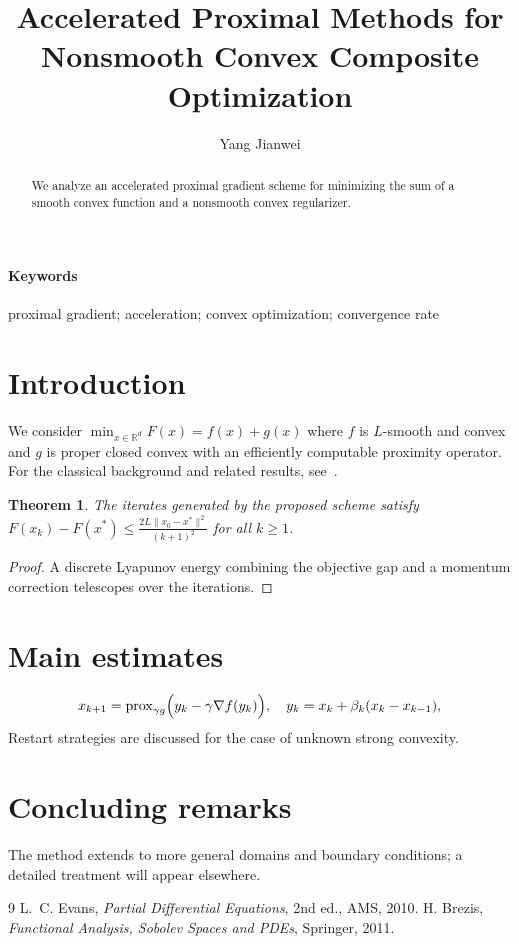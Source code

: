 \documentclass[review,11pt]{siamart}
\title{Accelerated Proximal Methods for Nonsmooth Convex Composite Optimization}
\author{Yang Jianwei}
\date{}
\def\YTfallback{1}
\newtheorem{theorem}{Theorem}[section]
\newcommand{\R}{\mathbb{R}}
\begin{document}
\maketitle
\ifdefined\YTfallback
\noindent{}
\bigskip
\fi
\begin{abstract}
We analyze an accelerated proximal gradient scheme for minimizing the sum of a smooth convex function and a nonsmooth convex regularizer.
\end{abstract}
\paragraph{Keywords} proximal gradient; acceleration; convex optimization; convergence rate

\section{Introduction}
We consider $\min_{x\in\R^d} F(x)=f(x)+g(x)$ where $f$ is $L$-smooth and convex and $g$ is proper closed convex with an efficiently computable proximity operator.
For the classical background and related results, see~\cite{Evans,Brezis}.

\begin{theorem}
The iterates generated by the proposed scheme satisfy $F(x_k)-F(x^\ast)\le \frac{2L\|x_0-x^\ast\|^2}{(k+1)^2}$ for all $k\ge1$.
\end{theorem}

\begin{proof}
A discrete Lyapunov energy combining the objective gap and a momentum correction telescopes over the iterations.
\end{proof}

\section{Main estimates}
\begin{equation}
x_{k+1}=\mathrm{prox}_{\gamma g}\Bigl(y_k-\gamma\nabla f(y_k)\Bigr),\quad y_k=x_k+\beta_k(x_k-x_{k-1}),
\end{equation}
Restart strategies are discussed for the case of unknown strong convexity.

\section{Concluding remarks}
The method extends to more general domains and boundary conditions; a detailed
treatment will appear elsewhere.

\begin{thebibliography}{9}
 L.~C. Evans, \emph{Partial Differential Equations}, 2nd ed., AMS, 2010.
 H. Brezis, \emph{Functional Analysis, Sobolev Spaces and PDEs}, Springer, 2011.
\end{thebibliography}
\end{document}
